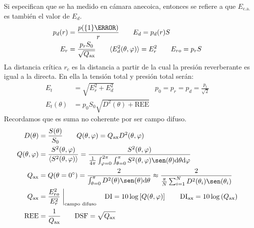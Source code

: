 \documentclass[a4paper, 8pt]{extarticle}
\renewcommand{\sin}{\sen}
\begin{document}
\begin{multicols}{3}
  Si especifican que se ha medido en cámara anecoica, entonces se refiere a que $E_{\text{c.a.}}$ es también el valor de $E_d$.
  \begin{align*}
    p_d (r) & = \frac{p (\qty{1}{\metre } )}{r} \qquad E_d = p_d (r) S                                                                  \\
    E_r     & = \frac{p_r S_0}{\sqrt{Q _{\textnormal{ax}}}} \qquad \langle E_d^2(\theta, \varphi) \rangle = E_r^2 \qquad E_{ro} = p_r S
  \end{align*}
  La distancia crítica $r_c$ es la distancia a partir de la cual la presión reverberante es igual a la directa. En ella la tensión total y presión total serán:
  \begin{align*}
    E_{t}           & = \sqrt{E_r ^2 + E_d ^2}                   & p_0 = p_r = p_d = \frac{p_{t}}{\sqrt{2}} \\
    E_{t} (\theta ) & = p_0 S_0 \sqrt{D^2(\theta ) + \text{REE}}
  \end{align*}
  Recordamos que es suma no coherente por ser campo difuso.
  \begin{align*}
    D( \theta)          & = \frac{S(\theta)}{S_0 } \qquad Q(\theta, \varphi ) = Q _{\textnormal{ax}} D^2                                                    (\theta, \varphi )                                                                              \\
    Q(\theta, \varphi ) & = \frac{S^2(\theta, \varphi )}{\langle S^2(\theta, \varphi) \rangle} = \frac{S^2(\theta, \varphi )}{\frac{1}{4\pi} \int_{\varphi = 0}^{2\pi} \int_{\theta = 0}^{\pi} S^2(\theta, \varphi) \sin (\theta ) \dd \theta \dd \varphi } \\
    Q_{\textnormal{ax}} & = Q(\theta = \ang{0}) = \frac{2}{\int_{\theta = 0}^{\pi} D^2(\theta) \sin (\theta ) \dd \theta } \approx \frac{2}{\frac{\pi}{N} \sum _{i=1}^{N} D^2(\theta _i) \sin (\theta _i)}                                                  \\
    Q_{\textnormal{ax}} & = \frac{E^2_{ro}} {E^2_r} \eval*{}_{\text{campo difuso}} \quad \text{DI} = 10 \log \left[ Q( \theta, \varphi) \right] \qquad \text{DI} _{\textnormal{ax}} = 10 \log \left( Q_{\textnormal{ax}} \right)                            \\
    \text{REE}          & = \frac{1}{Q_ {\textnormal{ax}}} \qquad \text{DSF} = \sqrt{Q_{\textnormal{ax}}}                                                                                                                                                   \\
  \end{align*}


\end{multicols}
\end{document}
